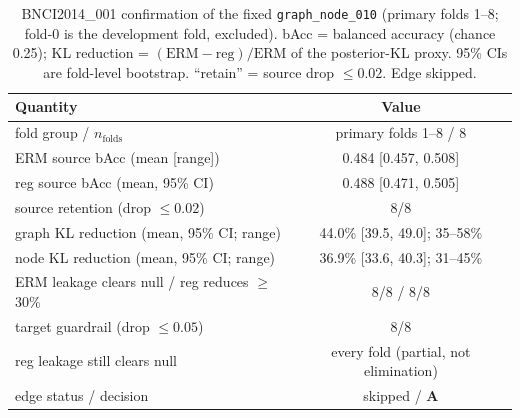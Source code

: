 \begin{table}[t]
\centering
\caption{BNCI2014\_001 confirmation of the fixed \texttt{graph\_node\_010} (primary folds 1--8; fold-0 is
the development fold, excluded). bAcc = balanced accuracy (chance 0.25); KL reduction = $(\mathrm{ERM}-
\mathrm{reg})/\mathrm{ERM}$ of the posterior-KL proxy. 95\% CIs are fold-level bootstrap. ``retain'' = source
drop $\le 0.02$. Edge skipped.}
\label{tab:bnci2014}
\small
\begin{tabular}{lc}
\toprule
Quantity & Value \\
\midrule
fold group / $n_{\mathrm{folds}}$        & primary folds 1--8 / 8 \\
ERM source bAcc (mean [range])           & 0.484 [0.457, 0.508] \\
reg source bAcc (mean, 95\% CI)          & 0.488 [0.471, 0.505] \\
source retention (drop $\le 0.02$)       & 8/8 \\
graph KL reduction (mean, 95\% CI; range)& 44.0\% [39.5, 49.0]; 35--58\% \\
node KL reduction (mean, 95\% CI; range) & 36.9\% [33.6, 40.3]; 31--45\% \\
ERM leakage clears null / reg reduces $\ge$30\% & 8/8 / 8/8 \\
target guardrail (drop $\le 0.05$)       & 8/8 \\
reg leakage still clears null            & every fold (partial, not elimination) \\
edge status / decision                   & skipped / \textbf{A} \\
\bottomrule
\end{tabular}
\end{table}

